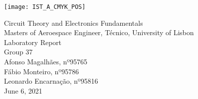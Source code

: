 
\thispagestyle {empty}

\texttt{[image: IST\_A\_CMYK\_POS]}

\begin{center}
%
\vspace{1.0cm}
\vspace{1cm}
{\FontLb Circuit Theory and Electronics Fundamentals} \\
\vspace{1cm}
{\FontSn Masters of Aeroespace Engineer, Técnico, University of Lisbon} \\ 
\vspace{1cm}
{\FontSn Laboratory Report} \\
\vspace{5mm}
{\FontSn Group 37} \\
\vspace{1cm}
{\FontSn Afonso Magalhães, nº95765}\\ 
{\FontSn Fábio Monteiro, nº95786}\\
{\FontSn Leonardo Encarnação, nº95816}\\
\vspace{14cm}
{\FontSn June 6, 2021}  
\end{center}

\newpage


